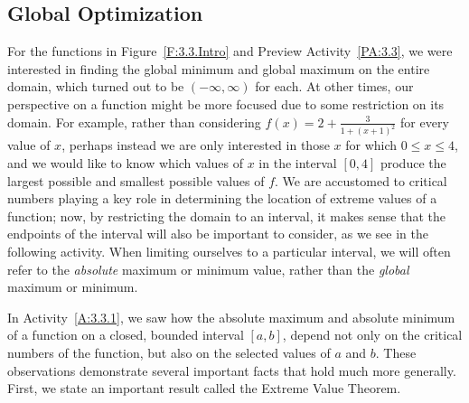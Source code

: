 

\subsection*{Global Optimization}

For the functions in Figure~\ref{F:3.3.Intro} and Preview Activity~\ref{PA:3.3}, we were interested in finding the global minimum and global maximum on the entire domain, which turned out to be $(-\infty, \infty)$ for each.  At other times, our perspective on a function might be more focused due to some restriction on its domain.  For example, rather than considering $f(x) = 2 + \frac{3}{1+(x+1)^2}$ for every value of $x$,  perhaps instead we are only interested in those $x$ for which $0 \le x \le 4$, and we would like to know which values of $x$ in the interval $[0,4]$ produce the largest possible and smallest possible values of $f$.  We are accustomed to critical numbers playing a key role in determining the location of extreme values of a function; now, by restricting the domain to an interval, it makes sense that the endpoints of the interval will also be important to consider, as we see in the following activity.  When limiting ourselves to a particular interval, we will often refer to the \emph{absolute} maximum or minimum value, rather than the \emph{global} maximum or minimum.

\newpage



In Activity~\ref{A:3.3.1}, we saw how the absolute maximum and absolute minimum of a function on a closed, bounded interval $[a,b]$, depend not only on the critical numbers of the function, but also on the selected values of $a$ and $b$.  These observations demonstrate several important facts that hold much more generally.  First, we state an important result called the Extreme Value Theorem.

\vspace*{5pt}
\nin {}
\vspace*{1pt}


